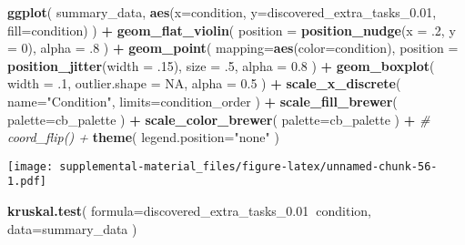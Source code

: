 \documentclass[]{book}
\newenvironment{Shaded}{\begin{snugshade}}{\end{snugshade}}
\newcommand{\CommentTok}[1]{\textcolor[rgb]{0.56,0.35,0.01}{\textit{#1}}}
\newcommand{\DataTypeTok}[1]{\textcolor[rgb]{0.13,0.29,0.53}{#1}}
\newcommand{\DecValTok}[1]{\textcolor[rgb]{0.00,0.00,0.81}{#1}}
\newcommand{\FloatTok}[1]{\textcolor[rgb]{0.00,0.00,0.81}{#1}}
\newcommand{\KeywordTok}[1]{\textcolor[rgb]{0.13,0.29,0.53}{\textbf{#1}}}
\newcommand{\NormalTok}[1]{#1}
\newcommand{\OperatorTok}[1]{\textcolor[rgb]{0.81,0.36,0.00}{\textbf{#1}}}
\newcommand{\OtherTok}[1]{\textcolor[rgb]{0.56,0.35,0.01}{#1}}
\newcommand{\StringTok}[1]{\textcolor[rgb]{0.31,0.60,0.02}{#1}}
\begin{document}
\begin{Shaded}
\begin{Highlighting}[]
\KeywordTok{ggplot}\NormalTok{(}
\NormalTok{    summary_data,}
    \KeywordTok{aes}\NormalTok{(}\DataTypeTok{x=}\NormalTok{condition, }\DataTypeTok{y=}\NormalTok{discovered_extra_tasks_}\FloatTok{0.01}\NormalTok{, }\DataTypeTok{fill=}\NormalTok{condition)}
\NormalTok{  ) }\OperatorTok{+}
\StringTok{  }\KeywordTok{geom_flat_violin}\NormalTok{(}
    \DataTypeTok{position =} \KeywordTok{position_nudge}\NormalTok{(}\DataTypeTok{x =} \FloatTok{.2}\NormalTok{, }\DataTypeTok{y =} \DecValTok{0}\NormalTok{),}
    \DataTypeTok{alpha =} \FloatTok{.8}
\NormalTok{  ) }\OperatorTok{+}
\StringTok{  }\KeywordTok{geom_point}\NormalTok{(}
    \DataTypeTok{mapping=}\KeywordTok{aes}\NormalTok{(}\DataTypeTok{color=}\NormalTok{condition),}
    \DataTypeTok{position =} \KeywordTok{position_jitter}\NormalTok{(}\DataTypeTok{width =} \FloatTok{.15}\NormalTok{),}
    \DataTypeTok{size =} \FloatTok{.5}\NormalTok{,}
    \DataTypeTok{alpha =} \FloatTok{0.8}
\NormalTok{  ) }\OperatorTok{+}
\StringTok{  }\KeywordTok{geom_boxplot}\NormalTok{(}
    \DataTypeTok{width =} \FloatTok{.1}\NormalTok{,}
    \DataTypeTok{outlier.shape =} \OtherTok{NA}\NormalTok{,}
    \DataTypeTok{alpha =} \FloatTok{0.5}
\NormalTok{  ) }\OperatorTok{+}
\StringTok{  }\KeywordTok{scale_x_discrete}\NormalTok{(}
    \DataTypeTok{name=}\StringTok{"Condition"}\NormalTok{,}
    \DataTypeTok{limits=}\NormalTok{condition_order}
\NormalTok{  ) }\OperatorTok{+}
\StringTok{  }\KeywordTok{scale_fill_brewer}\NormalTok{(}
    \DataTypeTok{palette=}\NormalTok{cb_palette}
\NormalTok{  ) }\OperatorTok{+}
\StringTok{  }\KeywordTok{scale_color_brewer}\NormalTok{(}
    \DataTypeTok{palette=}\NormalTok{cb_palette}
\NormalTok{  ) }\OperatorTok{+}
\StringTok{  }\CommentTok{# coord_flip() +}
\StringTok{  }\KeywordTok{theme}\NormalTok{(}
    \DataTypeTok{legend.position=}\StringTok{"none"}
\NormalTok{  )}
\end{Highlighting}
\end{Shaded}

\texttt{[image: supplemental-material\_files/figure-latex/unnamed-chunk-56-1.pdf]}

\begin{Shaded}
\begin{Highlighting}[]
\KeywordTok{kruskal.test}\NormalTok{(}
  \DataTypeTok{formula=}\NormalTok{discovered_extra_tasks_}\FloatTok{0.01}\OperatorTok{~}\NormalTok{condition,}
  \DataTypeTok{data=}\NormalTok{summary_data}
\NormalTok{)}
\end{Highlighting}
\end{Shaded}
\end{document}
